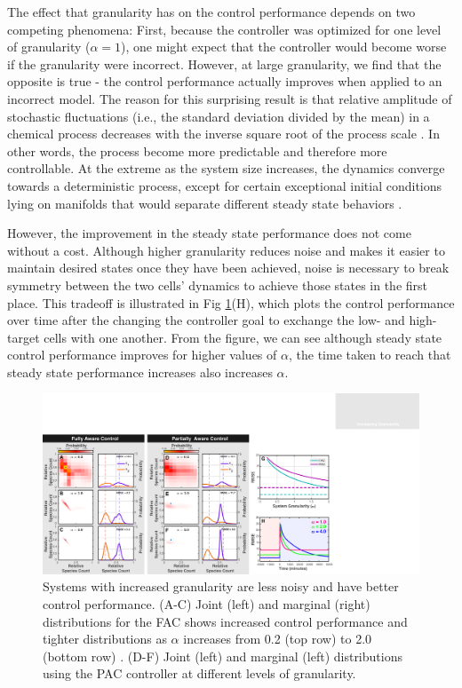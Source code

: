 \documentclass[12pt]{iopart}
\begin{document}
The effect that granularity has on the control performance depends on two competing phenomena: First, because the controller was optimized for one level of granularity ($\alpha = 1$), one might expect that the controller would become worse if the granularity were incorrect. However, at large granularity, we find that the opposite is true - the control performance actually improves when applied to an incorrect model. The reason for this surprising result is that relative amplitude of stochastic fluctuations (i.e., the standard deviation divided by the mean) in a chemical process decreases with the inverse square root of the process scale \cite{Kampen1961}. In other words, the process become more predictable and therefore more controllable. At the extreme as the system size increases, the dynamics converge towards a deterministic process, except for certain exceptional initial conditions lying on manifolds that would separate different steady state behaviors \cite{XXX}. 

However, the improvement in the steady state performance does not come without a cost. Although higher granularity reduces noise and makes it easier to maintain desired states once they have been achieved, noise is necessary to break symmetry between the two cells' dynamics to achieve those states in the first place. This tradeoff is illustrated in Fig \ref{Volume}(H), which plots the control performance over time after the changing the controller goal to exchange the low- and high-target cells with one another.  From the figure, we can see although steady state control performance improves for higher values of $\alpha$, the time taken to reach that steady state performance increases also increases $\alpha$. 


\begin{figure}[t!]
\begin{center}
\includegraphics[width=1\textwidth]{Granularity.pdf}
\vspace{-0.1in}
\caption{Systems with increased granularity are less noisy and have better control performance. (A-C) Joint (left) and marginal (right) distributions for the FAC shows increased control performance and tighter distributions as $\alpha$ increases from 0.2 (top row) to 2.0 (bottom row) . (D-F) Joint (left) and marginal (left) distributions using the PAC controller at different levels of granularity.}
\label{Volume}
\end{center}
\vspace{-0.2in}
\end{figure}
\end{document}
